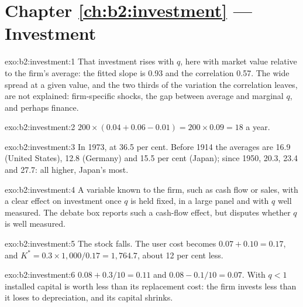 \section*{Chapter \ref{ch:b2:investment} --- Investment}

\begin{solution}{exo:b2:investment:1}
That investment rises with $q$, here with market value relative to the firm's average: the fitted slope is 0.93 and the correlation
0.57. The wide spread at a given value, and the two thirds of the variation the correlation leaves, are not explained:
firm-specific shocks, the gap between average and marginal $q$, and perhaps finance.
\end{solution}

\begin{solution}{exo:b2:investment:2}
$200 \times (0.04 + 0.06 - 0.01) = 200 \times 0.09 = 18$ a year.
\end{solution}

\begin{solution}{exo:b2:investment:3}
In 1973, at 36.5 per cent. Before 1914 the averages are 16.9 (United States), 12.8 (Germany) and 15.5 per cent (Japan); since 1950, 20.3,
23.4 and 27.7: all higher, Japan's most.
\end{solution}

\begin{solution}{exo:b2:investment:4}
A variable known to the firm, such as cash flow or sales, with a clear effect on investment once $q$ is held fixed, in a
large panel and with $q$ well measured. The debate box reports such a cash-flow effect, but disputes whether $q$ is well
measured.
\end{solution}

\begin{solution}{exo:b2:investment:5}
The stock falls. The user cost becomes $0.07 + 0.10 = 0.17$, and $K^* = 0.3 \times 1{,}000/0.17 = 1{,}764.7$, about 12 per cent less.
\end{solution}

\begin{solution}{exo:b2:investment:6}
$0.08 + 0.3/10 = 0.11$ and $0.08 - 0.1/10 = 0.07$. With $q < 1$ installed capital is worth less than its replacement cost: the firm invests less than
it loses to depreciation, and its capital shrinks.
\end{solution}

